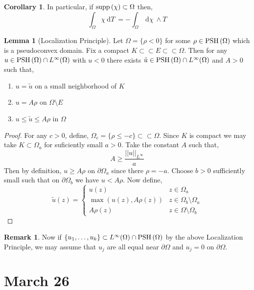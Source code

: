 \documentclass[12pt]{extarticle}
\renewcommand{\d}[1]{\: \mathrm{d}#1 \:}
\theoremstyle{definition}
\newtheorem{lemma}[theorem]{Lemma}
\newtheorem{corollary}[theorem]{Corollary}
\newtheorem{remark}{Remark}
\begin{document}
\begin{corollary}
In particular, if $\mathrm{supp}\left( \chi \right) \subset \Omega$ then,
\[ \int_\Omega \chi \d{T} = - \int_\Omega \d{\chi} \wedge T \]
\end{corollary}

\begin{lemma}[Localization Principle]
Let $\Omega = \{ \rho < 0 \}$ for some $\rho \in \mathrm{PSH}\left( \Omega \right)$ which is a pseudoconvex domain. Fix a compact $K \subset \subset E \subset \subset \Omega$. Then for any $u \in \mathrm{PSH}\left( \Omega \right) \cap L^\infty(\Omega)$ with $u < 0$ there exists $\tilde{u} \in \mathrm{PSH}\left( \Omega \right) \cap L^\infty(\Omega)$ and $A > 0$ such that,
\begin{enumerate}
\item $u = \tilde{u}$ on a small neighborhood of $K$
\item $u = A \rho$ on $\Omega \setminus E$
\item $u \le \tilde{u} \le A \rho$ in $\Omega$
\end{enumerate}
\end{lemma}

\begin{proof}
For any $c > 0$, define, $\Omega_c = \{ \rho \le - c \} \subset \subset \Omega$. Since $K$ is compact we may take $K \subset \Omega_a$ for suficiently small $a > 0$. Take the constant $A$ such that,
\[ A \ge \frac{||u||_{L^\infty}}{a} \]
Then by definition, $u \ge A \rho$ on $\partial \Omega_a$ since there $\rho = - a$. Choose $b > 0$ sufficiently small such that on $\partial \Omega_b$ we have $u < A \rho$. Now define,
\[ \tilde{u}(z) = \begin{cases}
u(z) & z \in \Omega_a
\\
\max{(u(z), A \rho(z))} & z \in \Omega_b \setminus \Omega_a 
\\
A \rho(z) & z \in \Omega \setminus \Omega_b 
\end{cases} \]
\end{proof}

\begin{remark}
Now if $\{ u_1, \dots, u_k \} \subset L^\infty(\Omega) \cap \mathrm{PSH}\left( \Omega \right)$ by the above Localization Principle, we may assume that $u_j$ are all equal near $\partial \Omega$ and $u_j = 0$ on $\partial \Omega$. 
\end{remark}

\section{March 26}
\end{document}
